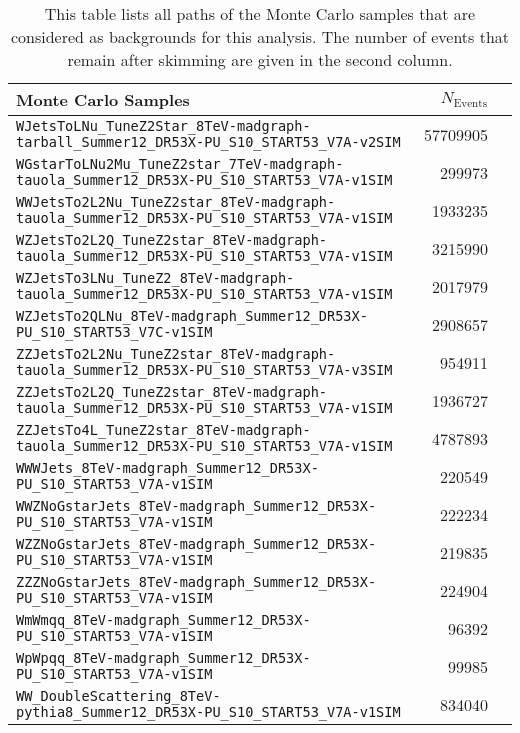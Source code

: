 \begin{sidewaystable}[ht!]
  \centering
  \begin{tabular}{|l|r|r|}
    \hline
    Monte Carlo Samples & $N_{\text{Events}}$ \\
    \hline
    \hline
    \verb+WJetsToLNu_TuneZ2Star_8TeV-madgraph-tarball_Summer12_DR53X-PU_S10_START53_V7A-v2SIM+ & 57709905 \\
    \hline
    \verb+WGstarToLNu2Mu_TuneZ2star_7TeV-madgraph-tauola_Summer12_DR53X-PU_S10_START53_V7A-v1SIM+ & 299973 \\
    \verb+WWJetsTo2L2Nu_TuneZ2star_8TeV-madgraph-tauola_Summer12_DR53X-PU_S10_START53_V7A-v1SIM+ & 1933235 \\
    \verb+WZJetsTo2L2Q_TuneZ2star_8TeV-madgraph-tauola_Summer12_DR53X-PU_S10_START53_V7A-v1SIM+ & 3215990 \\
    \verb+WZJetsTo3LNu_TuneZ2_8TeV-madgraph-tauola_Summer12_DR53X-PU_S10_START53_V7A-v1SIM+ & 2017979 \\
    \verb+WZJetsTo2QLNu_8TeV-madgraph_Summer12_DR53X-PU_S10_START53_V7C-v1SIM+ & 2908657 \\
    \verb+ZZJetsTo2L2Nu_TuneZ2star_8TeV-madgraph-tauola_Summer12_DR53X-PU_S10_START53_V7A-v3SIM+ & 954911 \\
    \verb+ZZJetsTo2L2Q_TuneZ2star_8TeV-madgraph-tauola_Summer12_DR53X-PU_S10_START53_V7A-v1SIM+ & 1936727 \\
    \verb+ZZJetsTo4L_TuneZ2star_8TeV-madgraph-tauola_Summer12_DR53X-PU_S10_START53_V7A-v1SIM+ & 4787893 \\
    \hline
    \verb+WWWJets_8TeV-madgraph_Summer12_DR53X-PU_S10_START53_V7A-v1SIM+ & 220549 \\
    \verb+WWZNoGstarJets_8TeV-madgraph_Summer12_DR53X-PU_S10_START53_V7A-v1SIM+ & 222234 \\
    \verb+WZZNoGstarJets_8TeV-madgraph_Summer12_DR53X-PU_S10_START53_V7A-v1SIM+ & 219835 \\
    \verb+ZZZNoGstarJets_8TeV-madgraph_Summer12_DR53X-PU_S10_START53_V7A-v1SIM+ & 224904 \\
    \hline
    \verb+WmWmqq_8TeV-madgraph_Summer12_DR53X-PU_S10_START53_V7A-v1SIM+ & 96392 \\
    \verb+WpWpqq_8TeV-madgraph_Summer12_DR53X-PU_S10_START53_V7A-v1SIM+ & 99985 \\
    \verb+WW_DoubleScattering_8TeV-pythia8_Summer12_DR53X-PU_S10_START53_V7A-v1SIM+ & 834040 \\
    \hline
  \end{tabular}
  \caption{This table lists all paths of the Monte Carlo samples that are considered as backgrounds for this analysis. The number of events that remain after skimming are given in the second column.}
  \label{tab:mcsamplepaths}
\end{sidewaystable}

